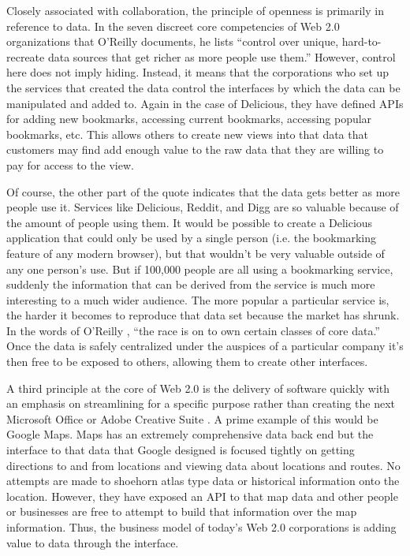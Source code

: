 Closely associated with collaboration, the principle of openness is primarily in
reference to data.  In the seven discreet core competencies of Web 2.0
organizations that O'Reilly \citeyearpar{oreilly2007} documents, he lists
``control over unique, hard-to-recreate data sources that get richer as more
people use them.''  However, control here does not imply hiding.  Instead, it
means that the corporations who set up the services that created the data
control the interfaces by which the data can be manipulated and added to. Again
in the case of Delicious, they have defined APIs for adding new bookmarks,
accessing current bookmarks, accessing popular bookmarks, etc.  This allows
others to create new views into that data that customers may find add enough
value to the raw data that they are willing to pay for access to the view.

Of course, the other part of the quote indicates that the data gets better as
more people use it.  Services like Delicious, Reddit, and Digg are so valuable
because of the amount of people using them.  It would be possible to create a
Delicious application that could only be used by a single person (i.e. the
bookmarking feature of any modern browser), but that wouldn't be very valuable
outside of any one person's use.  But if 100,000 people are all using a
bookmarking service, suddenly the information that can be derived from the
service is much more interesting to a much wider audience.  The more popular a
particular service is, the harder it becomes to reproduce that data set because
the market has shrunk.  In the words of O'Reilly \citeyearpar{oreilly2007},
``the race is on to own certain classes of core data.''  Once the data is safely
centralized under the auspices of a particular company it's then free to be
exposed to others, allowing them to create other interfaces.

A third principle at the core of Web 2.0 is the delivery of software quickly
with an emphasis on streamlining for a specific purpose rather than creating the
next Microsoft Office or Adobe Creative Suite \citep{miller2005}.  A prime
example of this would be Google Maps.  Maps has an extremely comprehensive data
back end but the interface to that data that Google designed is focused tightly
on getting directions to and from locations and viewing data about locations and
routes.  No attempts are made to shoehorn atlas type data or historical
information onto the location.  However, they have exposed an API to that map
data and other people or businesses are free to attempt to build that
information over the map information.  Thus, the business model of today's Web
2.0 corporations is adding value to data through the interface.

